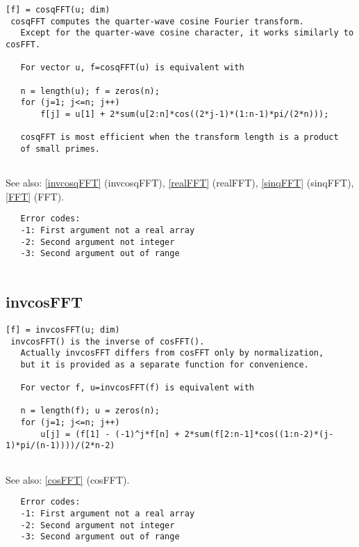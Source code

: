 \documentclass[a4paper]{article}
\begin{document}
\begin{tscreen}
\begin{verbatim}
[f] = cosqFFT(u; dim)
 cosqFFT computes the quarter-wave cosine Fourier transform.
   Except for the quarter-wave cosine character, it works similarly to cosFFT.
   
   For vector u, f=cosqFFT(u) is equivalent with

   n = length(u); f = zeros(n);
   for (j=1; j<=n; j++)
       f[j] = u[1] + 2*sum(u[2:n]*cos((2*j-1)*(1:n-1)*pi/(2*n)));
   
   cosqFFT is most efficient when the transform length is a product
   of small primes.
           
\end{verbatim}

See also: \ref{invcosqFFT} {(invcosqFFT)}, \ref{realFFT} {(realFFT)}, \ref{sinqFFT} {(sinqFFT)}, \ref{FFT} {(FFT)}.
\begin{verbatim}
   Error codes:
   -1: First argument not a real array
   -2: Second argument not integer
   -3: Second argument out of range
   
\end{verbatim}
\end{tscreen}



\subsection{invcosFFT\label{invcosFFT}}

\begin{tscreen}
\begin{verbatim}
[f] = invcosFFT(u; dim)
 invcosFFT() is the inverse of cosFFT().
   Actually invcosFFT differs from cosFFT only by normalization,
   but it is provided as a separate function for convenience.
   
   For vector f, u=invcosFFT(f) is equivalent with

   n = length(f); u = zeros(n);
   for (j=1; j<=n; j++)
       u[j] = (f[1] - (-1)^j*f[n] + 2*sum(f[2:n-1]*cos((1:n-2)*(j-1)*pi/(n-1))))/(2*n-2)
   
\end{verbatim}

See also: \ref{cosFFT} {(cosFFT)}.
\begin{verbatim}
   Error codes:
   -1: First argument not a real array
   -2: Second argument not integer
   -3: Second argument out of range
   
\end{verbatim}
\end{tscreen}
\end{document}
